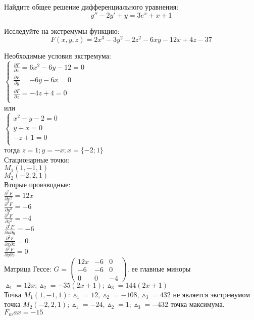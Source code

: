 \documentclass[addpoints, answers]{exam} %
\begin{document}
\begin{questions}
\begin{solution}
\end{solution}

\question	Найдите общее решение дифференциального уравнения:
\[ y''-2y'+y=3e^x+x+1
\]

\question	Исследуйте на экстремумы функцию:
 \[ F(x,y,z)=2x^3-3y^2-2z^2-6xy-12x+4z-37
 \]
\begin{solution}
Необходимые условия экстремума: \\
$
\begin{cases}
\frac{\partial F}{\partial x}=6x^2-6y-12=0\\
\frac{\partial F}{\partial y}=-6y-6x=0\\
\frac{\partial F}{\partial z}=-4z+4=0\\
\end{cases}
$
\\
 или\\
 $
\begin{cases}
x^2-y-2=0\\
y+x=0\\
-z+1=0\\
\end{cases}
$\\
тогда 	 $z=1; y=-x; x=\{-2;1\}$\\
Стационарные точки:\\
$M_1(1,-1,1)$\\
$M_2(-2,2,1)$ \\
Вторые производные:\\
$\frac{\partial^2 F}{\partial x^2}=12x$\\
$\frac{\partial^2 F}{\partial y^2}=-6$\\
$\frac{\partial^2 F}{\partial z^2}=-4$\\
$\frac{\partial^2 F}{\partial x\partial y}=-6$\\
$\frac{\partial^2 F}{\partial x\partial z}=0$\\
$\frac{\partial^2 F}{\partial y \partial z}=0$\\
Матрица Гессе:
$
 G=\left(\begin{array}{ccc}
12x & -6 & 0\\
-6 & -6 & 0\\
0 & 0 & -4
\end{array}\right).
$
ее главные миноры $\vartriangle_1=12x; \vartriangle_2=-35(2x+1); \vartriangle_3=144(2x+1)$\\
Точка $M_1(1,-1,1): \vartriangle_1=12, \vartriangle_2=-108, \vartriangle_3=432$  не является экстремумом
точка $M_2(-2,2,1); \vartriangle_1=-24, \vartriangle_2=1 ; \vartriangle_3=-432$  точка максимума.\\
$F_max=-15$


\end{solution}
\end{questions}
\end{document}
